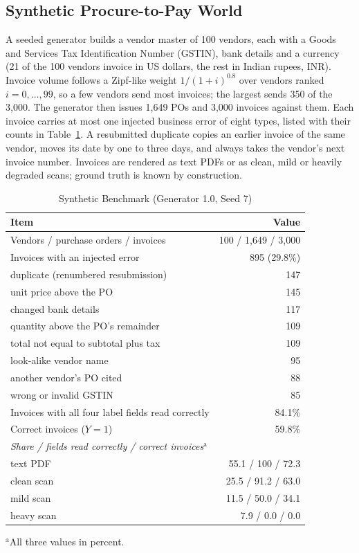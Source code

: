 \documentclass[conference]{IEEEtran}
\begin{document}
\subsection{Synthetic Procure-to-Pay World}
A seeded generator builds a vendor master of 100 vendors, each with a Goods and
Services Tax Identification Number (GSTIN), bank details and a currency (21 of the 100
vendors invoice in US dollars, the rest in Indian rupees, INR). Invoice volume
follows a Zipf-like weight $1/(1+i)^{0.8}$ over vendors ranked
$i=0,\dots,99$, so a few vendors send most invoices; the largest sends 350 of the
3,000. The generator then issues 1,649 POs and 3,000 invoices against them. Each
invoice carries at most one injected business error of eight types, listed with
their counts in Table~\ref{tab:data}. A resubmitted duplicate copies an earlier
invoice of the same vendor, moves its date by one to three days, and always
takes the vendor's next invoice number. Invoices are rendered as text PDFs or as
clean, mild or heavily degraded scans; ground truth is known by construction.

\begin{table}[t]
\caption{Synthetic Benchmark (Generator 1.0, Seed 7)}
\begin{center}
\begin{tabular}{|l|r|}
\hline
\textbf{Item} & \textbf{Value} \\
\hline
Vendors / purchase orders / invoices & 100 / 1,649 / 3,000 \\
Invoices with an injected error & 895 (29.8\%) \\
\quad duplicate (renumbered resubmission) & 147 \\
\quad unit price above the PO & 145 \\
\quad changed bank details & 117 \\
\quad quantity above the PO's remainder & 109 \\
\quad total not equal to subtotal plus tax & 109 \\
\quad look-alike vendor name & 95 \\
\quad another vendor's PO cited & 88 \\
\quad wrong or invalid GSTIN & 85 \\
Invoices with all four label fields read correctly & 84.1\% \\
Correct invoices ($Y=1$) & 59.8\% \\
\hline
\multicolumn{2}{|l|}{\textit{Share / fields read correctly / correct invoices}$^{\mathrm{a}}$} \\
\quad text PDF & 55.1 / 100 / 72.3 \\
\quad clean scan & 25.5 / 91.2 / 63.0 \\
\quad mild scan & 11.5 / 50.0 / 34.1 \\
\quad heavy scan & 7.9 / 0.0 / 0.0 \\
\hline
\end{tabular}

\vspace{2pt}
\parbox{\columnwidth}{\footnotesize $^{\mathrm{a}}$All three values in percent.}
\label{tab:data}
\end{center}
\end{table}
\end{document}
